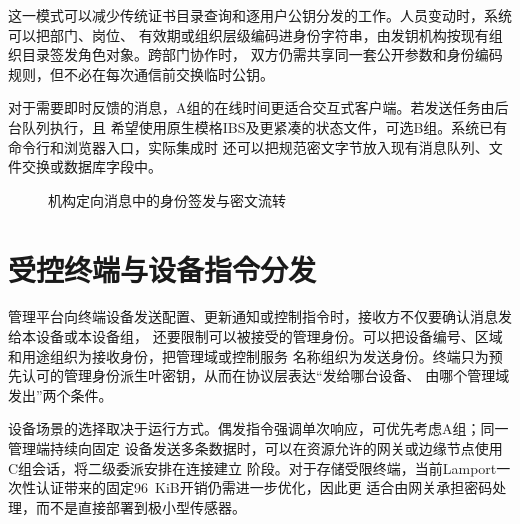这一模式可以减少传统证书目录查询和逐用户公钥分发的工作。人员变动时，系统可以把部门、岗位、
有效期或组织层级编码进身份字符串，由发钥机构按现有组织目录签发角色对象。跨部门协作时，
双方仍需共享同一套公开参数和身份编码规则，但不必在每次通信前交换临时公钥。

对于需要即时反馈的消息，A组的在线时间更适合交互式客户端。若发送任务由后台队列执行，且
希望使用原生模格IBS及更紧凑的状态文件，可选B组。系统已有命令行和浏览器入口，实际集成时
还可以把规范密文字节放入现有消息队列、文件交换或数据库字段中。

\begin{figure}[H]
\centering
{}
\caption{机构定向消息中的身份签发与密文流转}
\label{fig:institutional-message}
\end{figure}

\section{受控终端与设备指令分发}

管理平台向终端设备发送配置、更新通知或控制指令时，接收方不仅要确认消息发给本设备或本设备组，
还要限制可以被接受的管理身份。可以把设备编号、区域和用途组织为接收身份，把管理域或控制服务
名称组织为发送身份。终端只为预先认可的管理身份派生叶密钥，从而在协议层表达“发给哪台设备、
由哪个管理域发出”两个条件。

设备场景的选择取决于运行方式。偶发指令强调单次响应，可优先考虑A组；同一管理端持续向固定
设备发送多条数据时，可以在资源允许的网关或边缘节点使用C组会话，将二级委派安排在连接建立
阶段。对于存储受限终端，当前Lamport一次性认证带来的固定96~KiB开销仍需进一步优化，因此更
适合由网关承担密码处理，而不是直接部署到极小型传感器。

